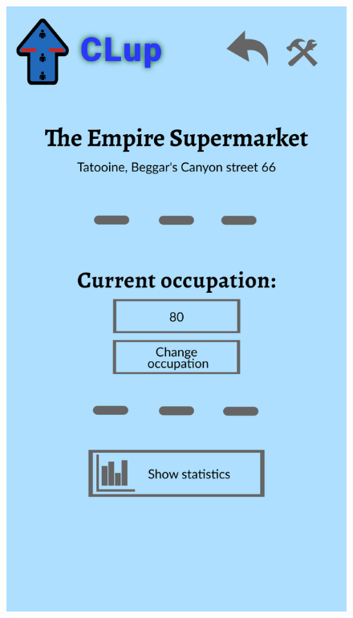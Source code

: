 \begin{itemize}
\begin{figure}[!htb]
		\includegraphics[scale=0.1]{Images/ModifyOccupation.png}
	\end{figure}
	
\end{itemize}
